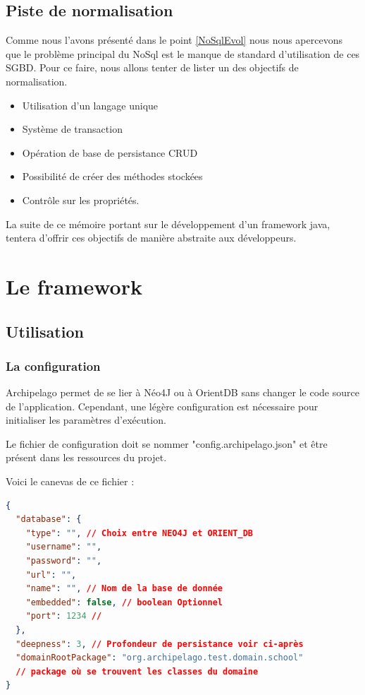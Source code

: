 \documentclass[a4paper,fleqn,12pt]{report}
\begin{document}
\section{Piste de normalisation}

Comme nous l'avons présenté dans le point \ref{NoSqlEvol} nous nous apercevons que le problème principal du NoSql est le manque de standard d'utilisation de ces SGBD. Pour ce faire, nous allons tenter de lister un des objectifs de normalisation.

\begin{itemize}
\item Utilisation d'un langage unique
\item Système de transaction 
\item Opération de base de persistance CRUD
\item Possibilité de créer des méthodes stockées
\item Contrôle sur les propriétés.
\end{itemize}

La suite de ce mémoire portant sur le développement d'un framework java, tentera d'offrir ces objectifs de manière abstraite aux développeurs.

\chapter{Le framework}
\section{Utilisation}
\label{opérations}
\subsection{La configuration}

Archipelago permet de se lier à Néo4J ou à OrientDB sans changer le code source de l'application. 
Cependant, une légère configuration est nécessaire pour initialiser les paramètres d'exécution.

Le fichier de configuration doit se nommer "config.archipelago.json" et être présent dans les ressources du projet.

Voici le canevas de ce fichier :

\begin{lstlisting}[language=json]
{
  "database": {
    "type": "", // Choix entre NEO4J et ORIENT_DB
    "username": "",
    "password": "",
    "url": "",
    "name": "", // Nom de la base de donnée
    "embedded": false, // boolean Optionnel
    "port": 1234 // 
  },
  "deepness": 3, // Profondeur de persistance voir ci-après
  "domainRootPackage": "org.archipelago.test.domain.school" 
  // package où se trouvent les classes du domaine 
}
\end{lstlisting}
\end{document}
